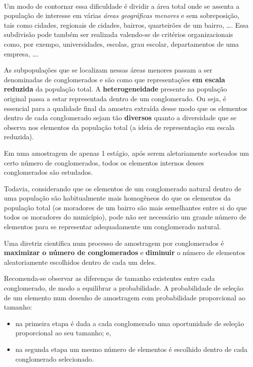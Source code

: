 \documentclass[
]{book}
\providecommand{\tightlist}{%
  \setlength{\itemsep}{0pt}\setlength{\parskip}{0pt}}
\begin{document}
~

Um modo de contornar essa dificuldade é dividir a área total onde se assenta a população de interesse em várias \emph{áreas geográficas menores} e sem sobreposição, tais como cidades, regionais de cidades, bairros, quarteirões de um bairro, \ldots. Essa subdivisão pode também ser realizada valendo-se de critérios organizacionais como, por exempo, universidades, escolas, grau escolar, departamentos de uma empresa, \ldots.

\hfill\break

As subpopulações que se localizam nessas áreas menores passam a ser denominadas de conglomerados e são como que representações \textbf{em escala reduzida} da população total. A \textbf{heterogeneidade} presente na população original passa a estar representada dentro de um conglomerado. Ou seja, é essencial para a qualidade final da amostra extraída desse modo que os elementos dentro de cada conglomerado sejam tão \textbf{diversos} quanto a diversidade que se observa nos elementos da população total (a ideia de representação em escala reduzida).

\hfill\break

Em uma amostragem de apenas 1 estágio, após serem aletariamente sorteados um certo número de conglomerados, todos os elementos internos desses conglomerados são estudados.

\hfill\break

Todavia, considerando que os elementos de um conglomerado natural dentro de uma população são habitualmente mais homogêneos do que os elementos da população total (os moradores de um bairro são mais semelhantes entre si do que todos os moradores do município), pode não ser necessário um grande número de elementos para se representar adequadamente um conglomerado natural.

\hfill\break

Uma diretriz científica num processo de amostragem por conglomerados é \textbf{maximizar o número de conglomerados} e \textbf{diminuir} o número de elementos aleatoriamente escolhidos dentro de cada um deles.

\hfill\break

Recomenda-se observar as diferenças de tamanho existentes entre cada conglomerado, de modo a equilibrar a probabilidade. A probabilidade de seleção de um elemento num desenho de amostragem com probabilidade proporcional ao tamanho:

\hfill\break

\begin{itemize}
\tightlist
\item
  na primeira etapa é dada a cada conglomerado uma oportunidade de seleção proporcional ao seu tamanho; e,\\
\item
  na segunda etapa um mesmo número de elementos é escolhido dentro de cada conglomerado selecionado.
\end{itemize}
\end{document}
